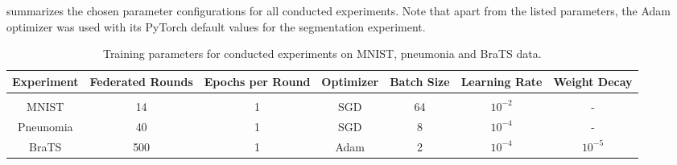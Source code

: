  summarizes the chosen parameter configurations for all conducted experiments.
Note that apart from the listed parameters, the Adam optimizer was used with its PyTorch default values for the segmentation experiment.

\begin{table}[htbp]
\begin{adjustbox}{width=1.0\textwidth}
  \centering
  \begin{tabular}{ccccccc}
  Experiment & Federated Rounds & Epochs per Round & Optimizer & Batch Size & Learning Rate & Weight Decay \\
  \hline \\[-2.5ex] %
  MNIST     & 14    & 1 & SGD   & 64 & $10^{-2}$ & - \\
  Pneunomia & 40    & 1 & SGD   & 8  & $10^{-4}$ & - \\
  BraTS     & 500   & 1 & Adam  & 2  & $10^{-4}$ & $10^{-5}$ \\
 \end{tabular}
 \end{adjustbox}
 \caption{Training parameters for conducted experiments on MNIST, pneumonia and BraTS data.}
 \label{tab:TrainingParameters}
\end{table}
